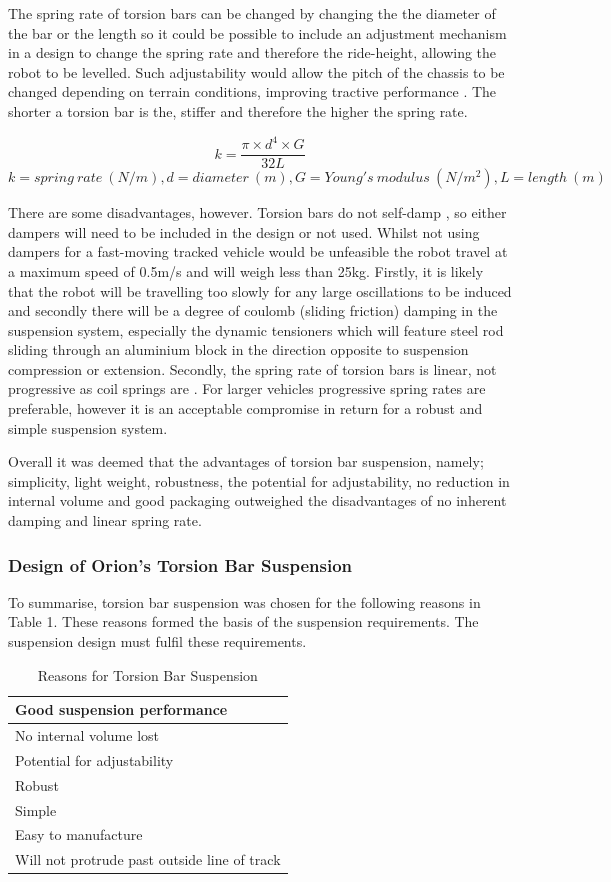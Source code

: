 The spring rate of torsion bars can be changed by changing the the diameter of the bar or the length so it could be possible to include an adjustment mechanism in a design to change the spring rate and therefore the ride-height, allowing the robot to be levelled. Such adjustability would allow the pitch of the chassis to be changed depending on terrain conditions, improving tractive performance \cite{Wong88}. The shorter a torsion bar is the, stiffer and therefore the higher the spring rate.

\[ k = \frac{ \pi\times d^4 \times G}{32L} \]
\[k = spring\:rate\:(N/m), d = diameter\:(m), G = Young's\:modulus\:(N/m^2), L = length\:(m)\]

There are some disadvantages, however. Torsion bars do not self-damp \cite{Hohl85}, so either dampers will need to be included in the design or not used. Whilst not using dampers for a fast-moving tracked vehicle would be unfeasible the robot travel at a maximum speed of 0.5m/s and will weigh less than 25kg. Firstly, it is likely that the robot will be travelling too slowly for any large oscillations to be induced and secondly there will be a degree of coulomb (sliding friction) damping \cite{Persson00}in the suspension system, especially the dynamic tensioners which will feature steel rod sliding through an aluminium block in the direction opposite to suspension compression or extension. Secondly, the spring rate of torsion bars is linear, not progressive as coil springs are \cite{Hohl85}. For larger vehicles progressive spring rates are preferable, however it is an acceptable compromise in return for a robust and simple suspension system.

Overall it was deemed that the advantages of torsion bar suspension, namely; simplicity, light weight, robustness, the potential for adjustability, no reduction in internal volume and good packaging outweighed the disadvantages of no inherent damping and linear spring rate. 


\subsubsection{Design of Orion's Torsion Bar Suspension}
To summarise, torsion bar suspension was chosen for the following reasons in Table 1. These reasons formed the basis of the suspension requirements. The suspension design must fulfil these requirements.
\begin{table}[h]
\centering
\begin{tabular}{l}
\hline
\textbf{Good suspension performance}\\
\hline
No internal volume lost\\
Potential for adjustability\\
Robust\\
Simple\\
Easy to manufacture\\
Will not protrude past outside line of track\\
\hline
\end{tabular}
\caption{Reasons for Torsion Bar Suspension}
\end{table}

